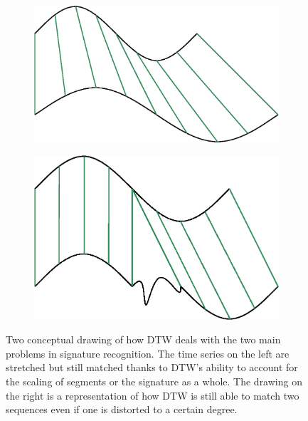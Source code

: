 \documentclass[a4paper, oneside]{csthesis}
\begin{document}
\begin{figure}
        \centering
        \begin{subfigure}[b]{0.30\textwidth}
                \centering
                \includegraphics[width=\textwidth]{figures/dtw-stretch.eps}
                \label{fig:hmm1}
        \end{subfigure}%
        \quad
        \begin{subfigure}[b]{0.30\textwidth}
                \centering
                \includegraphics[width=\textwidth]{figures/dtw-distort.eps}
                \label{fig:hmm1}
        \end{subfigure}%

        \caption{Two conceptual drawing of how DTW deals with the two main problems in signature recognition. The time series on the left are stretched but still matched thanks to DTW's ability to account for the scaling of segments or the signature as a whole. The drawing on the right is a representation of how DTW is still able to match two sequences even if one is distorted to a certain degree.}
        \label{fig:dtw-model}
\end{figure}
\end{document}
